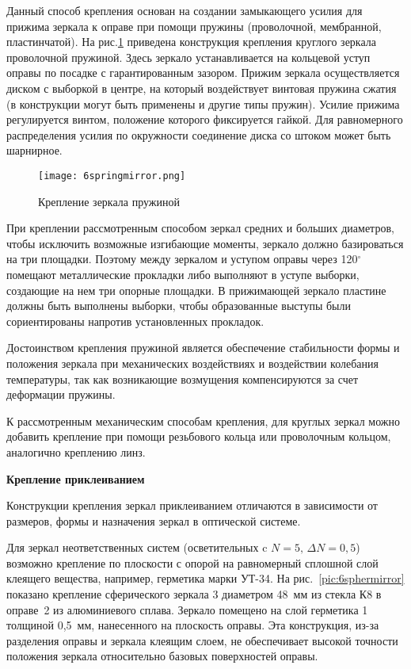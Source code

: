 Данный способ крепления основан на создании замыкающего усилия для прижима зеркала к оправе при помощи пружины (проволочной, мембранной, пластинчатой). На рис.\ref{pic:6springmirror} приведена конструкция крепления круглого зеркала проволочной пружиной. Здесь зеркало устанавливается на кольцевой уступ оправы по посадке с гарантированным зазором. Прижим зеркала осуществляется диском с выборкой в центре, на который воздействует винтовая пружина сжатия (в конструкции могут быть применены и другие типы пружин). Усилие прижима регулируется винтом, положение которого фиксируется гайкой. Для равномерного распределения усилия по окружности соединение диска со штоком может быть шарнирное.

\begin{figure}[h!]
	\caption{ Крепление зеркала пружиной }
	\texttt{[image: 6springmirror.png]}
	\label{pic:6springmirror}
\end{figure}

При креплении рассмотренным способом зеркал средних и больших диаметров, чтобы исключить возможные изгибающие моменты, зеркало должно базироваться на три площадки. Поэтому между зеркалом и уступом оправы через 120$ ^\circ $ помещают металлические прокладки либо выполняют в уступе выборки, создающие на нем три опорные площадки. В прижимающей зеркало пластине должны быть выполнены выборки, чтобы образованные выступы были сориентированы напротив установленных прокладок.

Достоинством крепления пружиной является обеспечение стабильности формы и положения зеркала при механических воздействиях и воздействии колебания температуры, так как возникающие возмущения компенсируются за счет деформации пружины.

К рассмотренным механическим способам крепления, для круглых зеркал можно добавить крепление при помощи резьбового кольца или проволочным кольцом, аналогично креплению линз.

\begin{flushleft}
	\textbf{Крепление приклеиванием}
\end{flushleft}

Конструкции крепления зеркал приклеиванием отличаются в зависимости от размеров, формы и назначения зеркал в оптической системе.

Для зеркал неответственных систем (осветительных c $ N=5,\, \Delta N=0,5 $) возможно крепление по плоскости с опорой на равномерный сплошной слой клеящего вещества, например, герметика марки УТ-34. На рис.~\ref{pic:6sphermirror} показано крепление сферического зеркала 3 диаметром 48~мм из стекла К8 в оправе~2 из алюминиевого сплава. Зеркало помещено на слой герметика 1 толщиной 0,5~мм, нанесенного на плоскость оправы. Эта конструкция, из-за разделения оправы и зеркала клеящим слоем, не обеспечивает высокой точности положения зеркала относительно базовых поверхностей оправы. 

